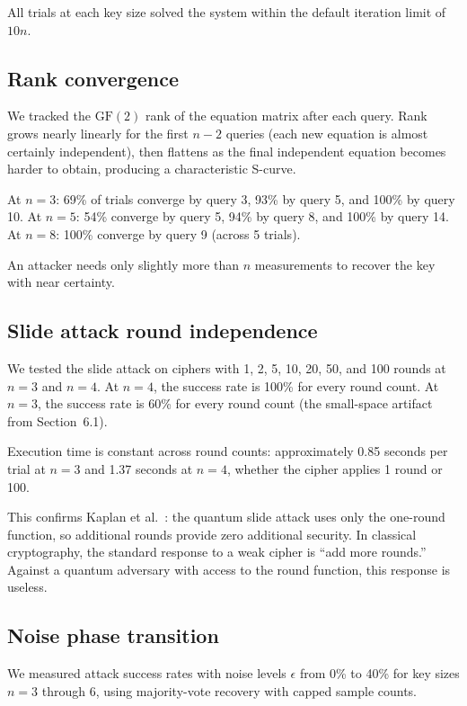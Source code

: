 \documentclass[11pt]{article}
\begin{document}
All trials at each key size solved the system within the default iteration limit of $10n$.

\subsection{Rank convergence}

We tracked the $\text{GF}(2)$ rank of the equation matrix after each query. Rank grows nearly linearly for the first $n-2$ queries (each new equation is almost certainly independent), then flattens as the final independent equation becomes harder to obtain, producing a characteristic S-curve.

At $n=3$: 69\% of trials converge by query 3, 93\% by query 5, and 100\% by query 10. At $n=5$: 54\% converge by query 5, 94\% by query 8, and 100\% by query 14. At $n=8$: 100\% converge by query 9 (across 5 trials).

An attacker needs only slightly more than $n$ measurements to recover the key with near certainty.

\subsection{Slide attack round independence}

We tested the slide attack on ciphers with 1, 2, 5, 10, 20, 50, and 100 rounds at $n=3$ and $n=4$. At $n=4$, the success rate is 100\% for every round count. At $n=3$, the success rate is 60\% for every round count (the small-space artifact from Section~6.1).

Execution time is constant across round counts: approximately 0.85 seconds per trial at $n=3$ and 1.37 seconds at $n=4$, whether the cipher applies 1 round or 100.

This confirms Kaplan et al.~\cite{kaplan2016}: the quantum slide attack uses only the one-round function, so additional rounds provide zero additional security. In classical cryptography, the standard response to a weak cipher is ``add more rounds.'' Against a quantum adversary with access to the round function, this response is useless.

\subsection{Noise phase transition}

We measured attack success rates with noise levels $\epsilon$ from 0\% to 40\% for key sizes $n=3$ through 6, using majority-vote recovery with capped sample counts.
\end{document}
